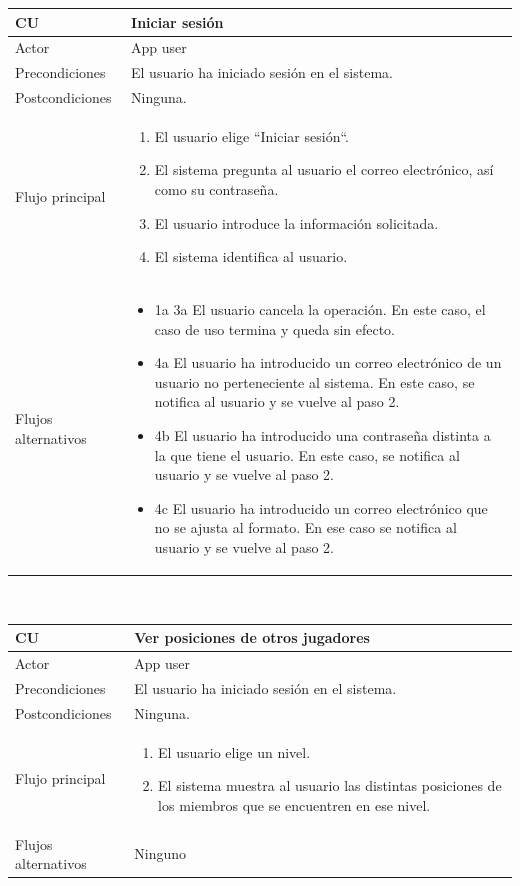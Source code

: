 \documentclass[twoside]{report}
\newcommand\addrow[2]{#1 &#2\\ }
\newcommand\addheading[2]{#1 &#2\\ \hline}
\newcommand\tabularhead{\begin{tabular}{lp{0.7\textwidth}}
\hline
}
\newenvironment{usecase}{\tabularhead}
{\hline\end{tabular}}
\begin{document}
\vspace{0.5cm}

\begin{usecase}
  \addheading{\textbf{CU\arabic{usecase}}}{Iniciar sesión} 
  \addrow{Actor}{App user}
  \addrow{Precondiciones}{El usuario ha iniciado sesión en el sistema.}
  \addrow{Postcondiciones}{Ninguna.}
  \addrow{Flujo principal}{
  		\begin{enumerate}
  		\item El usuario elige “Iniciar sesión“. %
  		\item El sistema pregunta al usuario el correo electrónico, así como su contraseña. %
  		\item El usuario introduce la información solicitada. %
  		\item El sistema identifica al usuario. %
  		\end{enumerate}
  }
  \addrow{Flujos alternativos}{
  		\begin{itemize}
  		\item 1a 3a El usuario cancela la operación. En este caso, el caso de uso termina y queda sin efecto.
  		\item 4a El usuario ha introducido un correo electrónico de un usuario no perteneciente al sistema. En este caso, se notifica al usuario y se vuelve al paso 2.
  		\item 4b El usuario ha introducido una contraseña distinta a la que tiene el usuario. En este caso, se notifica al usuario y se vuelve al paso 2.
  		\item 4c El usuario ha introducido un correo electrónico que no se ajusta al formato. En ese caso se notifica al usuario y se vuelve al paso 2.
  		\end{itemize}
  }
\end{usecase}\\

\vspace{0.5cm}

\begin{usecase}
  \addheading{\textbf{CU\arabic{usecase}}}{Ver posiciones de otros jugadores} 
  \addrow{Actor}{App user}
  \addrow{Precondiciones}{El usuario ha iniciado sesión en el sistema.}
  \addrow{Postcondiciones}{Ninguna.}
  \addrow{Flujo principal}{
  		\begin{enumerate}
  		\item El usuario elige un nivel.
  		\item El sistema muestra al usuario las distintas posiciones de los miembros que se encuentren en ese nivel.
  		\end{enumerate}
  }
  \addrow{Flujos alternativos}{Ninguno}
\end{usecase}\\
\end{document}
